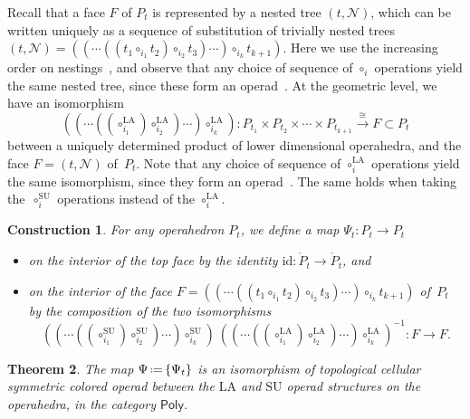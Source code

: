 \documentclass{amsart}
\newtheorem{theorem}{Theorem}[section]
\newtheorem{construction}[theorem]{Construction}
\theoremstyle{definition}
\newcommand{\eqdef}{\mbox{\,\raisebox{0.2ex}{\scriptsize\ensuremath{\mathrm:}}\ensuremath{=}\,}} %
\newcommand{\SU}{\mathrm{SU}}
\newcommand{\LA}{\mathrm{LA}}
\newcommand{\PolySub}{\mathsf{Poly}}
\newcommand{\id}{\mathrm{id}}
\begin{document}
Recall that a face $F$ of $P_t$ is represented by a nested tree $(t,\mathcal{N})$, which can be written uniquely as a sequence of substitution of trivially nested trees 
$(t,\mathcal{N})=((\cdots((t_1\circ_{i_1} t_2) \circ_{i_2} t_3) \cdots )\circ_{i_k} t_{k+1})$.
Here we use the increasing order on nestings~\cite[Def. 4.5]{LaplanteAnfossi}, and observe that any choice of sequence of $\circ_i$ operations yield the same nested tree, since these form an operad~\cite[Def.~4.7]{LaplanteAnfossi}.
At the geometric level, we have an isomorphism
\[((\cdots((\circ_{i_1}^\LA) \circ_{i_2}^\LA) \cdots) \circ_{i_k}^\LA): P_{t_1} \times P_{t_2} \times \cdots \times P_{t_{k+1}} \overset{\cong}{\longrightarrow} F \subset P_t \]
between a uniquely determined product of lower dimensional operahedra, and the face $F=(t,\mathcal{N})$ of~$P_t$.
Note that any choice of sequence of $\circ_i^\LA$ operations yield the same isomorphism, since they form an operad~\cite[Thm.~4.18]{LaplanteAnfossi}.
The same holds when taking the~$\circ_i^\SU$ operations instead of the $\circ_i^\LA$. 

\begin{construction}
	\label{const:top-iso}
	For any operahedron $P_t$, we define a map $\Psi_t : P_t \to P_t$ 
	\begin{itemize}
		\item on the interior of the top face by the identity $\id : \mathring P_t \to \mathring P_t$, and 
		\item on the interior of the face $F=((\cdots((t_1 \circ_{i_1} t_2) \circ_{i_2} t_3) \cdots )\circ_{i_k} t_{k+1})$ of~$P_t$ by the composition of the two isomorphisms
		\[ 
		((\cdots ((\circ_{i_1}^\SU) \circ_{i_2}^\SU) \cdots) \circ_{i_k}^\SU) \ ((\cdots((\circ_{i_1}^\LA) \circ_{i_2}^\LA) \cdots) \circ_{i_k}^\LA)^{-1}: F \to F . \] 
	\end{itemize}
\end{construction}

\begin{theorem}
\label{thm:top-iso}
The map $\Psi \eqdef \{\Psi_t\}$ is an isomorphism of topological cellular symmetric colored operad between the $\LA$ and $\SU$ operad structures on the operahedra, in the category $\PolySub$.
\end{theorem}
\end{document}

